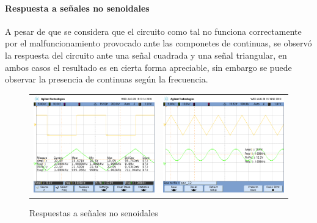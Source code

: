 \paragraph*{Respuesta a se\~nales no senoidales} A pesar de que se considera que el circuito como tal no funciona correctamente por el malfuncionamiento provocado ante las componetes de continuas,
se observ\'o la respuesta del circuito ante una se\~nal cuadrada y una se\~nal triangular, en ambos casos el resultado es en cierta forma apreciable, sin embargo se puede observar la presencia de continuas
seg\'un la frecuencia.

\begin{figure}[H]
	\centering
	\begin{tabular}{c c}
		\includegraphics[scale=0.2]{Integrador/Mediciones/Osciloscopio/PCB_Sin_Compensar/osc_11.png} & 
		\includegraphics[scale=0.2]{Integrador/Mediciones/Osciloscopio/PCB_Sin_Compensar/osc_12.png}
	\end{tabular}
	\caption{Respuestas a se\~nales no senoidales}
	\label{fig:integrador_respuestas}
\end{figure}

